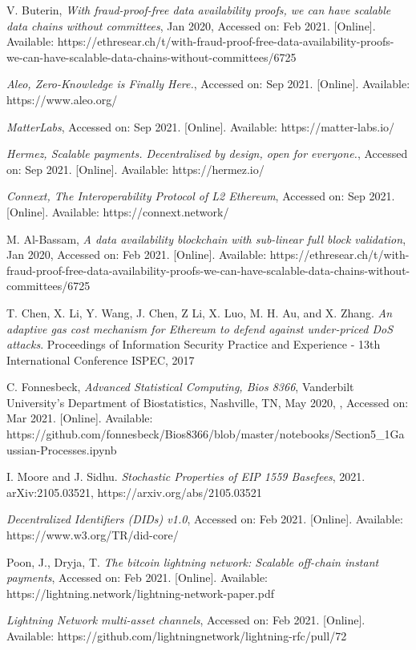\documentclass{ctexart}
\begin{document}
\begin{thebibliography}{00}
  V. Buterin, \textit{With fraud-proof-free data availability proofs, we can have scalable data chains without committees}, Jan 2020, Accessed on: Feb 2021.  [Online]. Available:  https://ethresear.ch/t/with-fraud-proof-free-data-availability-proofs-we-can-have-scalable-data-chains-without-committees/6725

  \textit{Aleo, Zero-Knowledge is Finally Here.}, Accessed on: Sep 2021. [Online]. Available: https://www.aleo.org/

  \textit{MatterLabs}, Accessed on: Sep 2021. [Online]. Available: https://matter-labs.io/

  \textit{Hermez, Scalable payments. Decentralised by design, open for everyone.}, Accessed on: Sep 2021. [Online]. Available: https://hermez.io/

  \textit{Connext, The Interoperability Protocol of L2 Ethereum}, Accessed on: Sep 2021. [Online]. Available: https://connext.network/

 M. Al-Bassam,\textit{ A data availability blockchain with sub-linear full block validation}, Jan 2020, Accessed on: Feb 2021.  [Online]. Available:  https://ethresear.ch/t/with-fraud-proof-free-data-availability-proofs-we-can-have-scalable-data-chains-without-committees/6725

  T. Chen, X. Li, Y. Wang, J. Chen, Z Li, X. Luo, M. H. Au, and X. Zhang. \textit{An adaptive gas cost mechanism for Ethereum to defend against under-priced DoS attacks}. Proceedings of Information Security Practice and Experience - 13th International Conference ISPEC, 2017

 C. Fonnesbeck, \textit{Advanced Statistical Computing, Bios 8366}, Vanderbilt University's Department of Biostatistics, Nashville, TN, May 2020, , Accessed on: Mar 2021.  [Online]. Available:  https://github.com/fonnesbeck/Bios8366/blob/master/notebooks/Section5\_1\-Gaussian-Processes.ipynb

  I. Moore and J. Sidhu. \textit{Stochastic Properties of EIP 1559 Basefees}, 2021. arXiv:2105.03521,  https://arxiv.org/abs/2105.03521

  \textit{Decentralized Identifiers (DIDs) v1.0}, Accessed on: Feb 2021. [Online]. Available: https://www.w3.org/TR/did-core/

  Poon, J., Dryja, T. \textit{The bitcoin lightning network: Scalable off-chain instant payments}, Accessed on: Feb 2021. [Online]. Available: https://lightning.network/lightning-network-paper.pdf

  \textit{Lightning Network multi-asset channels}, Accessed on: Feb 2021. [Online]. Available: https://github.com/lightningnetwork/lightning-rfc/pull/72






\end{thebibliography}
\end{document}
